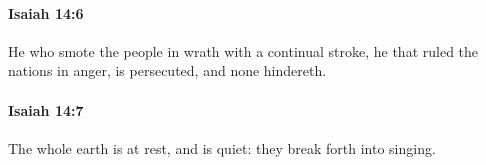 		\paragraph{Isaiah 14:6} %
			\label{ISAIAH-14-6}

			He who smote the people in wrath with a continual stroke, he that ruled the nations in anger, is persecuted, and none hindereth.


		\paragraph{Isaiah 14:7} %
			\label{ISAIAH-14-7}

			The whole earth is at rest, and is quiet: they break forth into singing.


